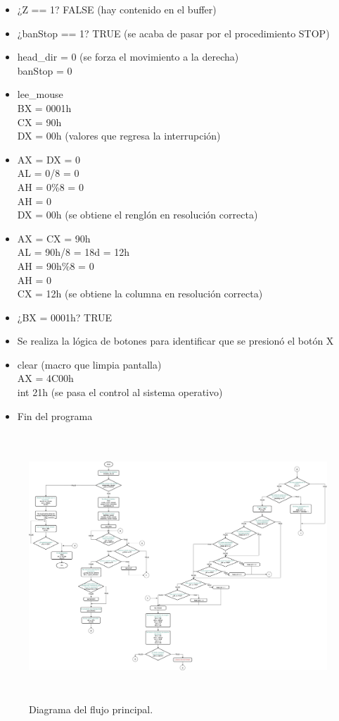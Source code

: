 \documentclass[12pt]{article}
\begin{document}
\begin{enumerate}
\begin{itemize}
        \item ¿Z == 1? FALSE (hay contenido en el buffer)
        \item ¿banStop == 1? TRUE (se acaba de pasar por el procedimiento STOP)
        \item head\_dir = 0 (se forza el movimiento a la derecha) \\ banStop = 0
        \item lee\_mouse \\ BX = 0001h\\ CX = 90h \\ DX = 00h (valores que regresa la interrupción)
        \item AX = DX = 0 \\ AL = 0/8 = 0 \\ AH = 0\%8 = 0 \\ AH = 0 \\DX = 00h (se obtiene el renglón en resolución correcta)
        \item AX = CX = 90h \\ AL = 90h/8 = 18d = 12h \\ AH = 90h\%8 = 0 \\ AH = 0 \\CX = 12h (se obtiene la columna en resolución correcta)
        \item ¿BX = 0001h? TRUE
        \item Se realiza la lógica de botones para identificar que se presionó el botón X
        \item clear (macro que limpia pantalla) \\ AX = 4C00h \\int 21h (se pasa el control al sistema operativo)
        \item Fin del programa
    \end{itemize}
\end{enumerate}

\begin{figure}
    \centering
    \includegraphics[height = 10cm]{img/diagramas/01DiagramaMain.jpg}
    \caption{Diagrama del flujo principal.}
    \label{fig:main}
\end{figure}
\end{document}
